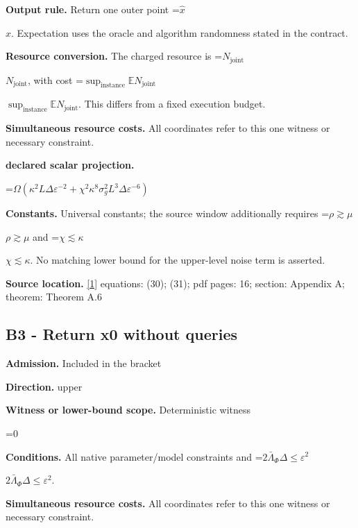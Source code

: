 \documentclass[10pt,a4paper]{article}
\newcommand{\AtlasMath}[1]{\par\begingroup\centering\setbox0=\hbox{$\displaystyle #1$}\ifdim\wd0>1.4\linewidth\typeout{ATLAS WIDE FORMULA: \the\wd0}\fi\ifdim\wd0>\linewidth\resizebox{\linewidth}{!}{\box0}\else\box0\fi\par\endgroup}
\newcommand{\AtlasInlineMath}[1]{\begingroup\setbox0=\hbox{$#1$}\ifdim\wd0>.4\linewidth\endgroup\AtlasMath{#1}\else\endgroup$#1$\fi}
\begin{document}
\textbf{Output rule.} Return one outer point \AtlasInlineMath{\widehat x}. Expectation uses the oracle and algorithm randomness stated in the contract.



\textbf{Resource conversion.} The charged resource is \AtlasInlineMath{N_{\mathrm{joint}}}, with cost \AtlasInlineMath{\sup_{\mathrm{instance}}\mathbb E N_{\mathrm{joint}}}. This differs from a fixed execution budget.



\textbf{Simultaneous resource costs.} All coordinates refer to this one witness or necessary constraint.



\textbf{declared scalar projection.}



\AtlasMath{\Omega (\kappa ^2 L\Delta  \varepsilon ^{-2}+\chi ^2 \kappa ^8 \sigma _g^2 L^3\Delta  \varepsilon ^{-6})}


\textbf{Constants.} Universal constants; the source window additionally requires \AtlasInlineMath{\rho\gtrsim\mu} and \AtlasInlineMath{\chi\lesssim\kappa}. No matching lower bound for the upper-level noise term is asserted.



\textbf{Source location.} \href{https://arxiv.org/pdf/2610.03633v2}{[1]} equations: (30); (31); pdf pages: 16; section: Appendix A; theorem: Theorem A.6



\subsection{B3 - Return x0 without queries}


\textbf{Admission.} Included in the bracket



\textbf{Direction.} upper



\textbf{Witness or lower-bound scope.} Deterministic witness



\AtlasMath{0}


\textbf{Conditions.} All native parameter/model constraints and \AtlasInlineMath{2\bar\Lambda_\Phi\Delta\le\varepsilon^2}.



\textbf{Simultaneous resource costs.} All coordinates refer to this one witness or necessary constraint.
\end{document}
